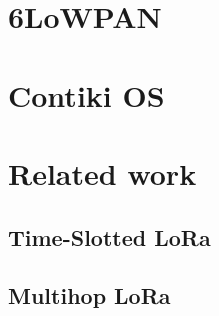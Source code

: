 
\section{6LoWPAN}


\section{Contiki OS}


\section{Related work}

\subsection{Time-Slotted LoRa}

\subsection{Multihop LoRa}


